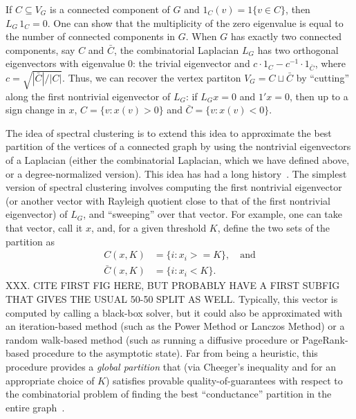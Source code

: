 \documentclass[12pt]{article}
\theoremstyle{plain}
\begin{document}
If $C \subseteq V_G$ is a connected component of $G$ and 
$1_C(v) = 1\{ v \in C \}$, then $L_G \, 1_C = 0$.  
One can show that the multiplicity of the zero eigenvalue is equal to the
number of connected components in $G$.
When $G$ has exactly two connected components, say $C$ and $\bar C$,
the combinatorial Laplacian $L_G$ has two orthogonal eigenvectors
with eigenvalue $0$: the trivial eigenvector and
$c \cdot 1_C - c^{-1} \cdot 1_{\bar C}$, where
$c = \sqrt{|\bar C| / |C|}$.  
Thus, we can recover the vertex partiton
$V_G = C \sqcup \bar C$ by ``cutting'' along the first nontrivial
eigenvector of $L_G$: if $L_G x = 0$ and $1' x = 0$, then up to a sign
change in $x$, $C = \{ v : x(v) > 0 \}$ and
$\bar C = \{ v : x(v) < 0 \}$.

The idea of spectral clustering is to extend this idea to approximate the 
best partition of the vertices of a connected graph by using the nontrivial 
eigenvectors of a Laplacian (either the combinatorial Laplacian, which we 
have defined above, or a degree-normalized version).  
This idea has had a long history~\cite{Donath:1973,fiedler75B,spielman96_spectral,guatterymiller98,ShiMalik00_NCut}.
The simplest version of spectral clustering involves computing the first 
nontrivial eigenvector (or another vector with Rayleigh quotient close to 
that of the first nontrivial eigenvector) of $L_G$, and ``sweeping'' over 
that vector. 
For example, 
one can take that vector, call it $x$, and, for a given threshold $K$, 
define the two sets of the partition as
\begin{align*}
  C(x,K)      &= \{ i : x_i >= K \}, \quad \text{and} \\
  \bar C(x,K) &= \{ i : x_i < K \}.
\end{align*}
XXX.  CITE FIRST FIG HERE, BUT PROBABLY HAVE A FIRST SUBFIG THAT GIVES THE USUAL 50-50 SPLIT AS WELL.
Typically, this vector is computed by calling a black-box solver, but it 
could also be approximated with an iteration-based method (such as the Power
Method or Lanczos Method) or a random walk-based method (such as running a 
diffusive procedure or PageRank-based procedure to the asymptotic state).
Far from being a heuristic, this procedure provides a \emph{global 
partition} that (via Cheeger's inequality and for an appropriate choice of 
$K$) satisfies provable quality-of-guarantees with respect to the 
combinatorial problem of finding the best ``conductance'' partition in the 
entire graph~\cite{Mihail,spielman96_spectral,guatterymiller98}.
\end{document}
